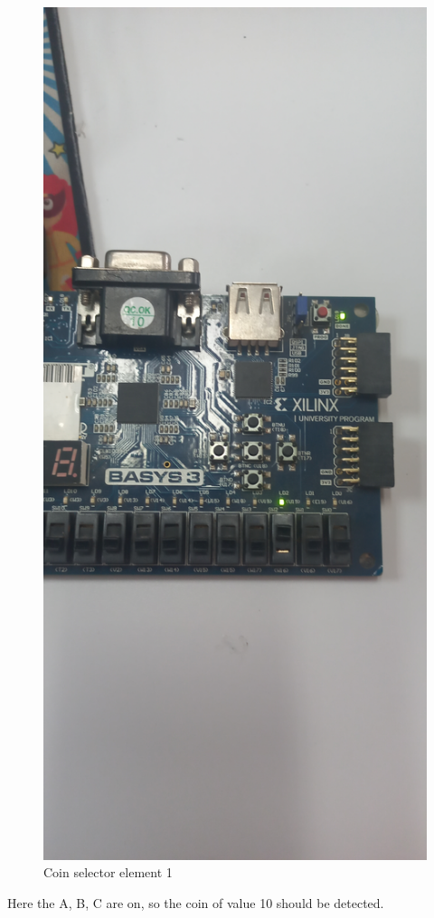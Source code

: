 \documentclass{article}
\begin{document}
\begin{multicols}{2}
	\begin{figure}[H]
		\centering
		\includegraphics[width=0.8\linewidth]{images/diagrams/coin-selector/coin-selector1.jpg}
		\caption{Coin selector element 1}
		\label{Coin selector element 1}
	\end{figure}

	Here the A, B, C are on, so the coin of value 10 should be detected.


\end{multicols}
\end{document}
